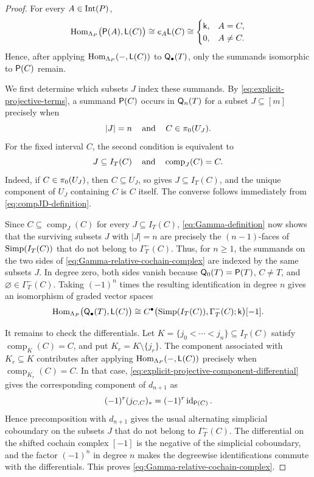 \begin{proof}
For every $A\in\operatorname{Int}(P)$,
\[
\operatorname{Hom}_{\Lambda_P}\bigl(\mathsf P(A),\mathsf L(C)\bigr)
\cong
e_A\mathsf L(C)
\cong
\begin{cases}
\mathsf{k},&A=C,\\
0,&A\neq C.
\end{cases}
\]
Hence, after applying
$\operatorname{Hom}_{\Lambda_P}(-,\mathsf L(C))$ to $\mathsf Q_\bullet(T)$,
only the summands isomorphic to $\mathsf P(C)$ remain.

We first determine which subsets $J$ index these summands.
By \eqref{eq:explicit-projective-terms}, a summand $\mathsf P(C)$ occurs in
$\mathsf Q_n(T)$ for a subset $J\subseteq[m]$ precisely when
\[
|J|=n
\operatorname{\quad \text{and} \quad}\nolimits
C\in\pi_0(U_J).
\]
For the fixed interval $C$, the second condition is equivalent to
\[
J\subseteq I_T(C)
\operatorname{\quad \text{and} \quad}\nolimits
\operatorname{comp}_J(C)=C.
\]
Indeed, if $C\in\pi_0(U_J)$, then $C\subseteq U_J$, so
 gives
$J\subseteq I_T(C)$, and the unique component of $U_J$ containing
$C$ is $C$ itself. The converse follows immediately from
\eqref{eq:compJD-definition}.

Since
$C\subseteq\operatorname{comp}_J(C)$ for every
$J\subseteq I_T(C)$, \eqref{eq:Gamma-definition} now shows that the
surviving subsets $J$ with $|J|=n$ are precisely the
$(n-1)$-faces of $\operatorname{Simp}(I_T(C))$ that do not belong to
$\Gamma_T^-(C)$. Thus, for $n\geq1$, the summands on the two sides of
\eqref{eq:Gamma-relative-cochain-complex} are indexed by the same
subsets $J$. In degree zero, both sides vanish because
$\mathsf Q_0(T)=\mathsf P(T)$, $C\neq T$, and
$\varnothing\in\Gamma_T^-(C)$.
Taking $(-1)^n$ times the resulting identification in degree $n$
gives an isomorphism of graded vector spaces
\[
\operatorname{Hom}_{\Lambda_P}\bigl(\mathsf Q_\bullet(T),\mathsf L(C)\bigr)
\cong
C^\bullet
\bigl(\operatorname{Simp}(I_T(C)),\Gamma_T^-(C);\mathsf{k}\bigr)[-1].
\]

It remains to check the differentials. Let
$K=\{j_0<\cdots<j_n\}\subseteq I_T(C)$ satisfy
$\operatorname{comp}_K(C)=C$, and put
$K_r=K\setminus\{j_r\}$.
The component associated with $K_r\subseteq K$ contributes after
applying $\operatorname{Hom}_{\Lambda_P}(-,\mathsf L(C))$ precisely when
$\operatorname{comp}_{K_r}(C)=C$.
In that case,
\eqref{eq:explicit-projective-component-differential} gives the
corresponding component of $d_{n+1}$ as
\[
(-1)^r(j_{C,C})_*
=
(-1)^r\operatorname{id}_{\mathsf P(C)}.
\]
Hence precomposition with $d_{n+1}$ gives the usual alternating
simplicial coboundary on the subsets $J$ that do not belong to
$\Gamma_T^-(C)$. The differential on the shifted cochain complex
$[-1]$ is the negative of the simplicial coboundary, and the factor
$(-1)^n$ in degree $n$ makes the degreewise identifications commute
with the differentials. This proves
\eqref{eq:Gamma-relative-cochain-complex}.


\end{proof}

